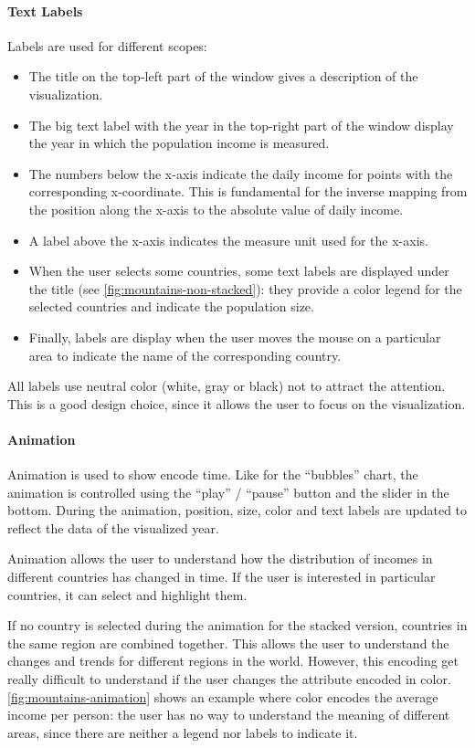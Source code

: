 \paragraph{Text Labels}
Labels are used for different scopes:
\begin{itemize}
	\item The title on the top-left part of the window gives a description of the visualization.
	\item The big text label with the year in the top-right part of the window display the year in which the population income is measured.
	\item The numbers below the x-axis indicate the daily income for points with the corresponding x-coordinate. This is fundamental for the inverse mapping from the position along the x-axis to the absolute value of daily income.
	\item A label above the x-axis indicates the measure unit used for the x-axis.
	\item When the user selects some countries, some text labels are displayed under the title (see \cref{fig:mountains-non-stacked}): they provide a color legend for the selected countries and indicate the population size.
	\item Finally, labels are display when the user moves the mouse on a particular area to indicate the name of the corresponding country.
\end{itemize}
All labels use neutral color (white, gray or black) not to attract the attention.
This is a good design choice, since it allows the user to focus on the visualization.

\paragraph{Animation}
Animation is used to show encode time.
Like for the ``bubbles'' chart, the animation is controlled using the ``play'' / ``pause'' button and the slider in the bottom.
During the animation, position, size, color and text labels are updated to reflect the data of the visualized year.

Animation allows the user to understand how the distribution of incomes in different countries has changed in time.
If the user is interested in particular countries, it can select and highlight them.

If no country is selected during the animation for the stacked version, countries in the same region are combined together.
This allows the user to understand the changes and trends for different regions in the world.
However, this encoding get really difficult to understand if the user changes the attribute encoded in color.
\cref{fig:mountains-animation} shows an example where color encodes the average income per person:
the user has no way to understand the meaning of different areas, since there are neither a legend nor labels to indicate it.

